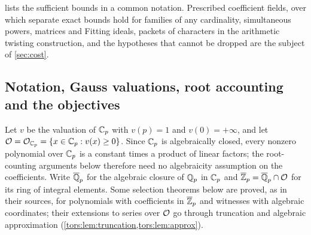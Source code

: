  lists the sufficient bounds in a common notation. Prescribed
coefficient fields, over which separate exact bounds hold for families of any
cardinality, simultaneous powers, matrices and Fitting ideals, packets of characters in
the arithmetic twisting construction, and the hypotheses that cannot be dropped are the
subject of \cref{sec:cost}.

\subsection{Notation, Gauss valuations, root accounting and the objectives}\label{tors:sec:setup}\label{cost:sec:setting}
{\raggedright{}}

Let $v$ be the valuation of $\mathbb{C}_p$ with $v(p)=1$ and $v(0)=+\infty$, and let
$\mathcal{O}=\mathcal{O}_{\mathbb{C}_p}=\{x\in\mathbb{C}_p: v(x)\ge0\}$. Since $\mathbb{C}_p$ is algebraically closed, every
nonzero polynomial over $\mathbb{C}_p$ is a constant times a product of linear factors; the
root-counting arguments below therefore need no algebraicity assumption on the
coefficients. Write $\overline{\mathbb{Q}}_p$ for the algebraic closure of $\mathbb{Q}_p$ in $\mathbb{C}_p$ and
$\overline{\mathbb{Z}}_p=\overline{\mathbb{Q}}_p\cap\mathcal{O}$ for its ring of integral elements. Some selection
theorems below are proved, as in their sources, for polynomials with coefficients in
$\overline{\mathbb{Z}}_p$ and witnesses with algebraic coordinates; their extensions to series
over $\mathcal{O}$ go through truncation and algebraic approximation
(\cref{tors:lem:truncation,tors:lem:approx}).

